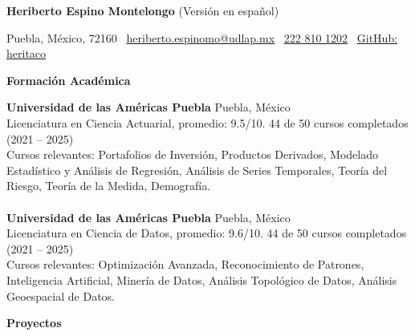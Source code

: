 \documentclass[9pt]{extarticle} %
\begin{document}
\newpage

{\fontsize{10pt}{12pt}\selectfont  
\begin{center}  
    \textbf{Heriberto Espino Montelongo} (Versión en español)\\  
    \vspace{-1ex} %
\end{center}  
}

\begin{center}  
    Puebla, México, 72160 \textbullet \   
    \href{mailto:heriberto.espinomo@udlap.mx}{\textcolor{customblue}{\underline{heriberto.espinomo@udlap.mx}}} \textbullet \   
    \href{tel:+522228101202}{\textcolor{customblue}{\underline{222 810 1202}}} \textbullet \   
    \href{https://github.com/heritaco}{\textcolor{customblue}{\underline{GitHub: heritaco}}}  
\end{center}

\begin{center}  
    \vspace{1ex}  
    \textbf{Formación Académica}  
    \vspace{-2ex}  
\end{center}

\textbf{Universidad de las Américas Puebla} \hfill Puebla, México\\  
Licenciatura en Ciencia Actuarial, promedio: 9.5/10. \hfill 44 de 50 cursos completados (2021 -- 2025) \\  
Cursos relevantes: Portafolios de Inversión, Productos Derivados, Modelado Estadístico y Análisis de Regresión, Análisis de Series Temporales, Teoría del Riesgo, Teoría de la Medida, Demografía.\\  
\\  
\textbf{Universidad de las Américas Puebla} \hfill Puebla, México\\  
Licenciatura en Ciencia de Datos, promedio: 9.6/10. \hfill 44 de 50 cursos completados (2021 -- 2025)\\  
Cursos relevantes: Optimización Avanzada, Reconocimiento de Patrones, Inteligencia Artificial, Minería de Datos, Análisis Topológico de Datos, Análisis Geoespacial de Datos.

\begin{center}  
    \vspace{1ex}  
    \textbf{Proyectos}  
    \vspace{-1ex}  
\end{center}
\end{document}
